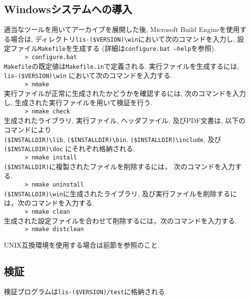 \documentclass[a4paper]{jarticle}
\begin{document}
{{\subsection{Windowsシステムへの導入}
適当なツールを用いてアーカイブを展開した後, 
Microsoft Build Engineを使用する場合は, 
ディレクトリ{\tt lis-(\$VERSION)\textbackslash win}において次のコマンドを入力し, 
設定ファイル{\tt Makefile}を生成する 
(詳細は{\tt configure.bat --help}を参照). \\
 \verb+      > configure.bat+\\
{\tt Makefile}の既定値は{\tt Makefile.in}で定義される. 
実行ファイルを生成するには, {\tt lis-(\$VERSION)\textbackslash win}
において次のコマンドを入力する. \\
 \verb+      > nmake+\\
実行ファイルが正常に生成されたかどうかを確認するには, 
次のコマンドを入力し, 生成された実行ファイルを用いて検証を行う. \\
 \verb+      > nmake check+\\
生成されたライブラリ, 実行ファイル, ヘッダファイル, 及びPDF文書は,
以下のコマンドにより\\
{\tt (\$INSTALLDIR)\textbackslash lib}, 
{\tt (\$INSTALLDIR)\textbackslash bin},
{\tt (\$INSTALLDIR)\textbackslash include}, 
及び{\tt (\$INSTALLDIR)\textbackslash doc}
にそれぞれ格納される. \\
 \verb+      > nmake install+\\
{\tt (\$INSTALLDIR)}に複製されたファイルを削除するには，
次のコマンドを入力する. \\
 \verb+      > nmake uninstall+\\
{\tt (\$INSTALLDIR)\textbackslash win}に生成されたライブラリ,
及び実行ファイルを削除するには，次のコマンドを入力する. \\
 \verb+      > nmake clean+\\
生成された設定ファイルを合わせて削除するには，次のコマンドを入力する. \\
 \verb+      > nmake distclean+

UNIX互換環境を使用する場合は前節を参照のこと. 

\subsection{検証}
検証プログラムは{\tt lis-(\$VERSION)/test}に格納される. 
}}
\end{document}

